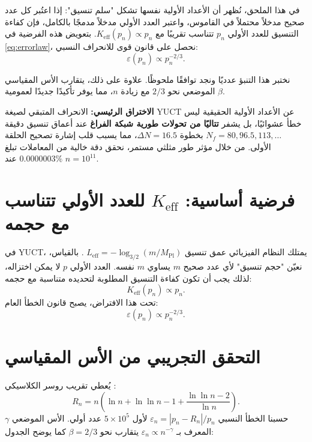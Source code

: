 \documentclass[12pt,a4paper]{article}
\begin{document}
	في هذا الملحق، نُظهر أن الأعداد الأولية نفسها تشكل "سلم تنسيق": إذا اعتُبر كل عدد صحيح مدخلاً محتملاً في القاموس، واعتبر العدد الأولي مدخلاً مدمجًا بالكامل، فإن كفاءة التنسيق للعدد الأولي $p_n$ تتناسب تقريبًا مع \(K_{\mathrm{eff}}(p_n) \propto p_n\). بتعويض هذه الفرضية في \eqref{eq:errorlaw}، نحصل على قانون قوى للانحراف النسبي:
	\[
	\varepsilon(p_n) \propto p_n^{-2/3}.
	\]
	
	نختبر هذا التنبؤ عدديًا ونجد توافقًا ملحوظًا. علاوة على ذلك، يتقارب الأس المقياسي الموضعي نحو $2/3$ مع زيادة $n$، مما يوفر تأكيدًا جديدًا لعمومية $\beta$.
	
	\textbf{الاختراق الرئيسي:} الانحراف المتبقي لصيغة YUCT عن الأعداد الأولية الحقيقية ليس خطأ عشوائيًا، بل يشفر \textbf{تتاليًا من تحولات طورية شبكة الفراغ} عند أعماق تنسيق دقيقة \(N_f = 80, 96.5, 113, \dots\) بخطوة \(\Delta N = 16.5\)، مما يسبب قلب إشارة تصحيح الحلقة الأولى. من خلال مؤثر طور مثلثي مستمر، نحقق دقة خالية من المعاملات تبلغ $0.0000003\%$ عند $n=10^{11}$.
	
	\section{فرضية أساسية: \(K_{\mathrm{eff}}\) للعدد الأولي تتناسب مع حجمه}
	في YUCT، يمتلك النظام الفيزيائي عمق تنسيق \(L_{\mathrm{eff}} = -\log_{3/2}(m/M_{\mathrm{Pl}})\) \cite{YakushevLaw2026}. بالقياس، نعيّن "حجم تنسيق" لأي عدد صحيح $m$ يساوي $m$ نفسه. العدد الأولي $p$ لا يمكن اختزاله، لذلك يجب أن تكون كفاءة التنسيق المطلوبة لتحديده متناسبة مع حجمه:
	\begin{equation}\label{eq:Keff-prime}
		K_{\mathrm{eff}}(p_n) \propto p_n.
	\end{equation}
	تحت هذا الافتراض، يصبح قانون الخطأ العام:
	\begin{equation}\label{eq:error-prime}
		\varepsilon(p_n) \propto p_n^{-2/3}.
	\end{equation}
	
	\section{التحقق التجريبي من الأس المقياسي}
	يُعطي تقريب روسر الكلاسيكي \cite{Rosser1941}:
	\begin{equation}\label{eq:rosser}
		R_n = n\!\left(\ln n + \ln\ln n - 1 + \frac{\ln\ln n - 2}{\ln n}\right).
	\end{equation}
	حسبنا الخطأ النسبي \(\varepsilon_n = |p_n - R_n|/p_n\) لأول $5\times10^5$ عدد أولي. الأس الموضعي $\gamma$ المعرف بـ \(\varepsilon_n \propto n^{-\gamma}\) يتقارب نحو $\beta = 2/3$ كما يوضح الجدول:
	
\end{document}
